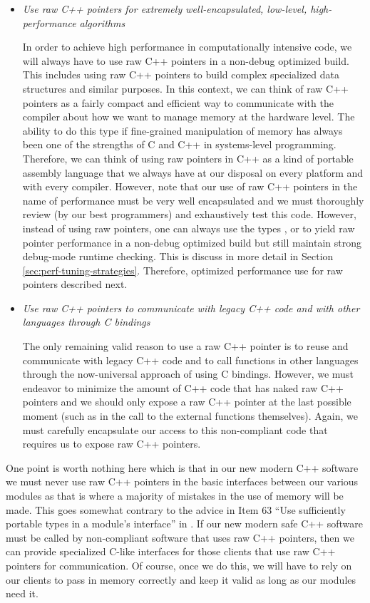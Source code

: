 \documentclass[pdf,ps2pdf,11pt]{SANDreport}
\begin{document}
\begin{itemize}

{}\item{}\textit{Use raw C++ pointers for extremely well-encapsulated,
low-level, high-performance algorithms}

In order to achieve high performance in computationally intensive
code, we will always have to use raw C++ pointers in a non-debug
optimized build.  This includes using raw C++ pointers to build
complex specialized data structures and similar purposes.  In this
context, we can think of raw C++ pointers as a fairly compact and
efficient way to communicate with the compiler about how we want to
manage memory at the hardware level.  The ability to do this type if
fine-grained manipulation of memory has always been one of the
strengths of C and C++ in systems-level programming.  Therefore, we
can think of using raw pointers in C++ as a kind of portable assembly
language that we always have at our disposal on every platform and
with every compiler.  However, note that our use of raw C++ pointers
in the name of performance must be very well encapsulated and we must
thoroughly review (by our best programmers) and exhaustively test this
code.  However, instead of using raw pointers, one can always use the
types {}, {} or
{} to yield raw pointer performance
in a non-debug optimized build but still maintain strong debug-mode
runtime checking.  This is discuss in more detail in Section
{}\ref{sec:perf-tuning-strategies}.  Therefore, optimized performance
use for raw pointers described next.

{}\item{}\textit{Use raw C++ pointers to communicate with legacy C++
code and with other languages through C bindings}

The only remaining valid reason to use a raw C++ pointer is to reuse
and communicate with legacy C++ code and to call functions in other
languages through the now-universal approach of using C bindings.
However, we must endeavor to minimize the amount of C++ code that has
naked raw C++ pointers and we should only expose a raw C++ pointer at
the last possible moment (such as in the call to the external
functions themselves).  Again, we must carefully encapsulate our
access to this non-compliant code that requires us to expose raw C++
pointers.

\end{itemize}

One point is worth nothing here which is that in our new modern C++
software we must never use raw C++ pointers in the basic interfaces
between our various modules as that is where a majority of mistakes in
the use of memory will be made.  This goes somewhat contrary to the
advice in Item 63 ``Use sufficiently portable types in a module's
interface'' in {}\cite{C++CodingStandards05}.  If our new modern safe
C++ software must be called by non-compliant software that uses raw
C++ pointers, then we can provide specialized C-like interfaces for
those clients that use raw C++ pointers for communication.  Of course,
once we do this, we will have to rely on our clients to pass in memory
correctly and keep it valid as long as our modules need it.
\end{document}

